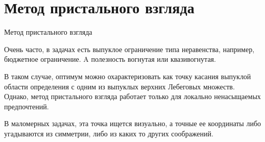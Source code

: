 \documentclass{beamer}
\begin{document}
\section{Метод пристального взгляда}

\begin{frame}{Метод пристального взгляда}

Очень часто, в задачах есть выпуклое ограничение типа неравенства, например, бюджетное ограничение. A полезность вогнутая или квазивогнутая.

В таком случае, оптимум можно охарактеризовать как точку касания выпуклой области определения с одним из выпуклых верхних Лебеговых множеств. Однако, \alert{метод пристального взгляда работает только для локально ненасыщаемых предпочтений}. 

В маломерных задачах, эта точка ищется визуально, а точные ее координаты либо угадываются из симметрии, либо из каких то других соображений.

\end{frame}
\end{document}
